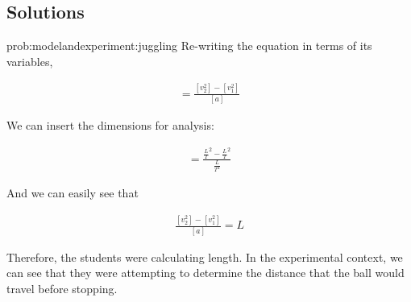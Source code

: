 \subsection{Solutions}

\begin{solution}{prob:modelandexperiment:juggling}\label{soln:modelandexperiment:juggling} Re-writing the equation in terms of its variables,

\begin{align*}
=\frac{[v_2^{2}]-[v_1^{2}]}{[a]}
\end{align*}

We can insert the dimensions for analysis:

\begin{align*}
=\frac{\frac{L}{T}^{2}-\frac{L}{T}^{2}}{\frac{L}{T^{2}}}
\end{align*}

And we can easily see that 

\begin{align*}
\frac{[v_2^{2}]-[v_1^{2}]}{[a]} = L
\end{align*}

Therefore, the students were calculating length. In the experimental context, we can see that they were attempting to determine the distance that the ball would travel before stopping.\end{solution}


